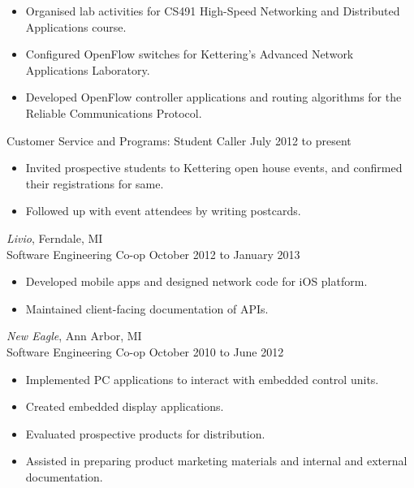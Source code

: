 \documentclass{res}
\begin{document}
\begin{resume}
   \begin{itemize} \itemsep -2pt
   \item Organised lab activities for CS491 High-Speed Networking and 
         Distributed Applications course.
   \item Configured OpenFlow switches for Kettering's Advanced Network 
         Applications Laboratory.
   \item Developed OpenFlow controller applications and routing algorithms 
         for the Reliable Communications Protocol.
   \end{itemize}
\vspace{-8pt}
Customer Service and Programs: Student Caller \hfill July 2012 to present

   \begin{itemize} \itemsep -2pt
   \item Invited prospective students to Kettering open house events, and 
   confirmed their registrations for same. 
   \item Followed up with event attendees by writing postcards.
   \end{itemize} 

{\sl Livio}, Ferndale, MI \\
Software Engineering Co-op       \hfill   October 2012 to January 2013
  
   \begin{itemize} \itemsep -2pt %
   \item Developed mobile apps and designed network code for iOS platform.
   \item Maintained client-facing documentation of APIs. 
   \end{itemize}

{\sl New Eagle}, Ann Arbor, MI \\
Software Engineering Co-op \hfill October 2010 to June 2012

   \begin{itemize} \itemsep -2pt
   \item Implemented PC applications to interact with embedded control units.
   \item Created embedded display applications.
   \item Evaluated prospective products for distribution.
   \item Assisted in preparing product marketing materials and internal and 
         external documentation.
   \end{itemize} 

\vspace{0.1in} 

\end{resume}
\end{document}
